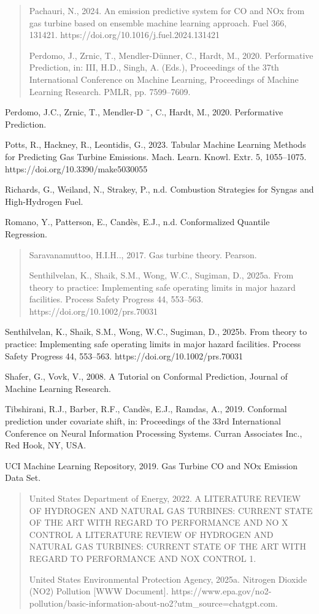 \documentclass[11pt]{article}
\begin{document}
\begin{quote}
Pachauri, N., 2024. An emission predictive system for CO and NOx from
gas turbine based on ensemble machine learning approach. Fuel 366,
131421. https://doi.org/10.1016/j.fuel.2024.131421

Perdomo, J., Zrnic, T., Mendler-Dünner, C., Hardt, M., 2020.
Performative Prediction, in: III, H.D., Singh, A. (Eds.), Proceedings of
the 37th International Conference on Machine Learning, Proceedings of
Machine Learning Research. PMLR, pp. 7599--7609.
\end{quote}

Perdomo, J.C., Zrnic, T., Mendler-D ¨, C., Hardt, M., 2020. Performative
Prediction.

Potts, R., Hackney, R., Leontidis, G., 2023. Tabular Machine Learning
Methods for Predicting Gas Turbine Emissions. Mach. Learn. Knowl. Extr.
5, 1055--1075. https://doi.org/10.3390/make5030055

Richards, G., Weiland, N., Strakey, P., n.d. Combustion Strategies for
Syngas and High-Hydrogen Fuel.

Romano, Y., Patterson, E., Candès, E.J., n.d. Conformalized Quantile
Regression.

\begin{quote}
Saravanamuttoo, H.I.H.., 2017. Gas turbine theory. Pearson.

Senthilvelan, K., Shaik, S.M., Wong, W.C., Sugiman, D., 2025a. From
theory to practice: Implementing safe operating limits in major hazard
facilities. Process Safety Progress 44, 553--563.
https://doi.org/10.1002/prs.70031
\end{quote}

Senthilvelan, K., Shaik, S.M., Wong, W.C., Sugiman, D., 2025b. From
theory to practice: Implementing safe operating limits in major hazard
facilities. Process Safety Progress 44, 553--563.
https://doi.org/10.1002/prs.70031

Shafer, G., Vovk, V., 2008. A Tutorial on Conformal Prediction, Journal
of Machine Learning Research.

Tibshirani, R.J., Barber, R.F., Candès, E.J., Ramdas, A., 2019.
Conformal prediction under covariate shift, in: Proceedings of the 33rd
International Conference on Neural Information Processing Systems.
Curran Associates Inc., Red Hook, NY, USA.

UCI Machine Learning Repository, 2019. Gas Turbine CO and NOx Emission
Data Set.

\begin{quote}
United States Department of Energy, 2022. A LITERATURE REVIEW OF
HYDROGEN AND NATURAL GAS TURBINES: CURRENT STATE OF THE ART WITH REGARD
TO PERFORMANCE AND NO X CONTROL A LITERATURE REVIEW OF HYDROGEN AND
NATURAL GAS TURBINES: CURRENT STATE OF THE ART WITH REGARD TO
PERFORMANCE AND NOX CONTROL 1.

United States Environmental Protection Agency, 2025a. Nitrogen Dioxide
(NO2) Pollution {[}WWW Document{]}.
https://www.epa.gov/no2-pollution/basic-information-about-no2?utm\_source=chatgpt.com.
\end{quote}
\end{document}
